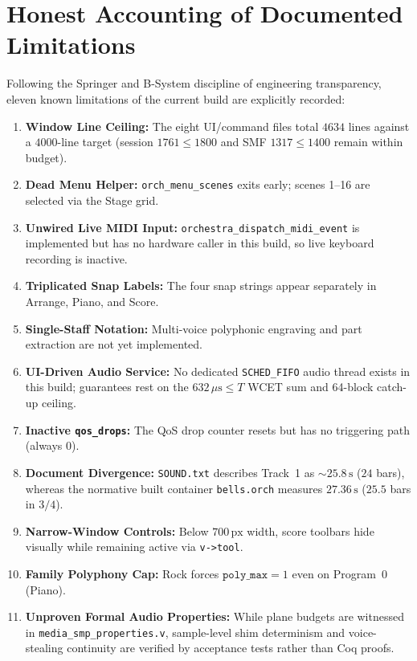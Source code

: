 \section{Honest Accounting of Documented Limitations}

Following the Springer and B-System discipline of engineering transparency, eleven known limitations of the current build are explicitly recorded:
\begin{enumerate}[leftmargin=1.5em]
  \item \textbf{Window Line Ceiling:} The eight UI/command files total $4634$ lines against a $4000$-line target (session $1761 \le 1800$ and SMF $1317 \le 1400$ remain within budget).
  \item \textbf{Dead Menu Helper:} \texttt{orch\_menu\_scenes} exits early; scenes 1--16 are selected via the Stage grid.
  \item \textbf{Unwired Live MIDI Input:} \texttt{orchestra\_dispatch\_midi\_event} is implemented but has no hardware caller in this build, so live keyboard recording is inactive.
  \item \textbf{Triplicated Snap Labels:} The four snap strings appear separately in Arrange, Piano, and Score.
  \item \textbf{Single-Staff Notation:} Multi-voice polyphonic engraving and part extraction are not yet implemented.
  \item \textbf{UI-Driven Audio Service:} No dedicated \texttt{SCHED\_FIFO} audio thread exists in this build; guarantees rest on the $632\,\mu\text{s} \le T$ WCET sum and 64-block catch-up ceiling.
  \item \textbf{Inactive \texttt{qos\_drops}:} The QoS drop counter resets but has no triggering path (always $0$).
  \item \textbf{Document Divergence:} \texttt{SOUND.txt} describes Track~1 as $\sim 25.8\,\text{s}$ ($24$ bars), whereas the normative built container \texttt{bells.orch} measures $27.36\,\text{s}$ ($25.5$ bars in $3/4$).
  \item \textbf{Narrow-Window Controls:} Below $700\,\text{px}$ width, score toolbars hide visually while remaining active via \texttt{v->tool}.
  \item \textbf{Family Polyphony Cap:} Rock forces $\texttt{poly\_max} = 1$ even on Program~0 (Piano).
  \item \textbf{Unproven Formal Audio Properties:} While plane budgets are witnessed in \texttt{media\_smp\_properties.v}, sample-level shim determinism and voice-stealing continuity are verified by acceptance tests rather than Coq proofs.
\end{enumerate}
